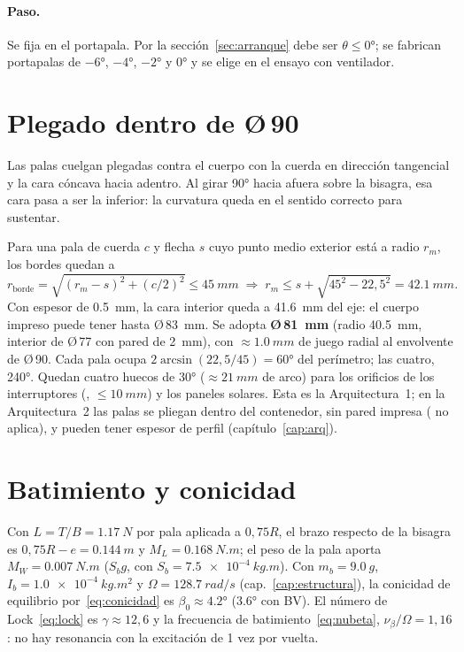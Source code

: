 \paragraph{Paso.} Se fija en el portapala. Por la sección~\ref{sec:arranque} debe ser
$\theta\le\ang{0}$; se fabrican portapalas de $\ang{-6}$, $\ang{-4}$, $\ang{-2}$ y $\ang{0}$
y se elige en el ensayo con ventilador.

\section{Plegado dentro de Ø\,90}\label{sec:plegado}
Las palas cuelgan plegadas contra el cuerpo con la cuerda en dirección tangencial y la
cara cóncava hacia adentro. Al girar \ang{90} hacia afuera sobre la bisagra, esa cara
pasa a ser la inferior: la curvatura queda en el sentido correcto para sustentar.

Para una pala de cuerda $c$ y flecha $s$ cuyo punto medio exterior está a radio $r_m$, los
bordes quedan a
\begin{equation}
  r_{\text{borde}} = \sqrt{(r_m-s)^2 + (c/2)^2} \le \SI{45}{mm}
  \;\Rightarrow\; r_m \le s + \sqrt{45^2 - 22{,}5^2} = \SI{42.1}{mm}.
\end{equation}
Con espesor de \SI{0.5}{mm}, la cara interior queda a \SI{41.6}{mm} del eje: el cuerpo
impreso puede tener hasta Ø\,\SI{83}{mm}. Se adopta \textbf{Ø\,\SI{81}{mm}} (radio
\SI{40.5}{mm}, interior de Ø\,77 con pared de \SI{2}{mm}), con $\approx\SI{1.0}{mm}$ de
juego radial al envolvente de Ø\,90. Cada pala ocupa $2\arcsin(22{,}5/45)=\ang{60}$ del
perímetro; las cuatro, \ang{240}. Quedan cuatro huecos de \ang{30} ($\approx\SI{21}{mm}$ de
arco) para los orificios de los interruptores (, $\le\SI{10}{mm}$) y los paneles
solares. Esta es la Arquitectura~1; en la Arquitectura~2 las palas se pliegan dentro del
contenedor, sin pared impresa ( no aplica), y pueden tener espesor de perfil
(capítulo~\ref{cap:arq}).

\section{Batimiento y conicidad}\label{sec:dim-batimiento}
Con $L=T/B=\SI{1.17}{N}$ por pala aplicada a $0{,}75R$, el brazo respecto de la bisagra es
$0{,}75R-e=\SI{0.144}{m}$ y $M_L=\SI{0.168}{N.m}$; el peso de la pala aporta
$M_W=\SI{0.007}{N.m}$ ($S_b g$, con $S_b=\SI{7.5e-4}{kg.m}$). Con $m_b=\SI{9.0}{g}$, $I_b=\SI{1.0e-4}{kg.m^2}$ y
$\Omega=\SI{128.7}{rad/s}$ (cap.~\ref{cap:estructura}), la conicidad de equilibrio
por~\eqref{eq:conicidad} es $\beta_0\approx\ang{4.2}$ (\ang{3.6} con BV). El número de
Lock~\eqref{eq:lock} es $\gamma\approx12{,}6$ y la frecuencia de
batimiento~\eqref{eq:nubeta}, $\nu_\beta/\Omega=1{,}16$: no hay resonancia con la excitación
de 1 vez por vuelta.

